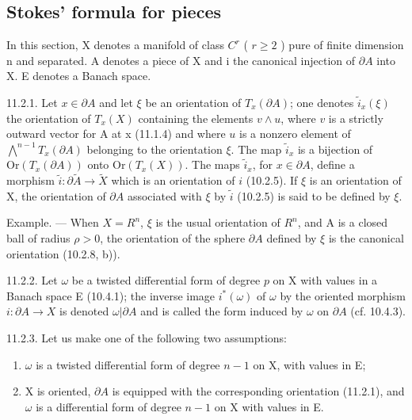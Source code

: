 \subsection{Stokes' formula for pieces}

In this section, X denotes a manifold of class \(C^{r}\) ( \(r \geqslant 2\) ) pure of finite dimension n and separated. A denotes a piece of X and i the canonical injection of \(\partial A\) into X. E denotes a Banach space.

11.2.1. Let \(x \in \partial A\) and let \(\xi\) be an orientation of \(T_x(\partial A)\); one denotes \(\tilde{i}_x(\xi)\) the orientation of \(T_x(X)\) containing the elements \(v \wedge u\), where \(v\) is a strictly outward vector for A at x (11.1.4) and where \(u\) is a nonzero element of \(\bigwedge^{n-1} T_x(\partial A)\) belonging to the orientation \(\xi\). The map \(\tilde{i}_x\) is a bijection of \(\text{Or}(T_x(\partial A))\) onto \(\text{Or}(T_x(X))\). The maps \(\tilde{i}_x\), for \(x \in \partial A\), define a morphism \(\tilde{i} \colon \partial \widetilde{A} \to \widetilde{X}\) which is an orientation of \(i\) (10.2.5). If \(\xi\) is an orientation of X, the orientation of \(\partial A\) associated with \(\xi\) by \(\tilde{i}\) (10.2.5) is said to be defined by \(\xi\).

Example. --- When \(X = R^{n}\), \(\xi\) is the usual orientation of \(R^{n}\), and A is a closed ball of radius \(\rho>0\), the orientation of the sphere \(\partial A\) defined by \(\xi\) is the canonical orientation (10.2.8, b)).

11.2.2. Let \(\omega\) be a twisted differential form of degree \(p\) on X with values in a Banach space E (10.4.1); the inverse image \(i^{*}(\omega)\) of \(\omega\) by the oriented morphism \(i\colon\partial A\to X\) is denoted \(\omega|\partial A\) and is called the form induced by \(\omega\) on \(\partial A\) (cf. 10.4.3).

11.2.3. Let us make one of the following two assumptions:

\begin{enumerate}
\def\labelenumi{(\roman{enumi})}
\tightlist
\item
  \(\omega\) is a twisted differential form of degree \(n - 1\) on X, with values in E;
\item
  X is oriented, \(\partial A\) is equipped with the corresponding orientation (11.2.1), and \(\omega\) is a differential form of degree \(n - 1\) on X with values in E.
\end{enumerate}

